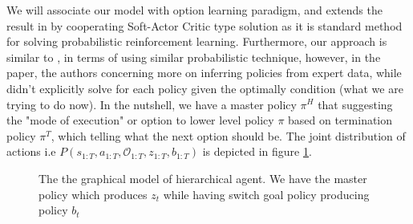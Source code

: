\label{sec:chap4-single-soft-HRL}
We will associate our model with option learning paradigm, and extends the result in \cite{igl2019multitask} by cooperating Soft-Actor Critic type solution as it is standard method for solving probabilistic reinforcement learning. Furthermore, our approach is similar to \cite{daniel2016probabilistic}, in terms of using similar probabilistic technique, however, in the paper, the authors concerning more on inferring policies from expert data, while didn't explicitly solve for each policy given the optimally condition (what we are trying to do now). In the nutshell, we have a master policy $\pi^H$ that suggesting the "mode of execution" or option to lower level policy $\pi$ based on termination policy $\pi^T$, which telling what the next option should be. The joint distribution of actions i.e $P(s_{1:T}, a_{1:T}, \mathcal{O}_{1:T}, z_{1:T}, b_{1:T})$ is depicted in figure \ref{fig:chap4-single-agent-hierarchical}.
\begin{figure}[ht]
    \begin{minipage}[t]{0.5\linewidth}
    \centering
    \end{minipage}%
    \begin{minipage}[t]{0.5\linewidth}
    \caption{The the graphical model of hierarchical agent. We have the master policy which produces $z_t$ while having switch goal policy producing policy $b_t$}
    \label{fig:chap4-single-agent-hierarchical}
    \end{minipage}
\end{figure}
